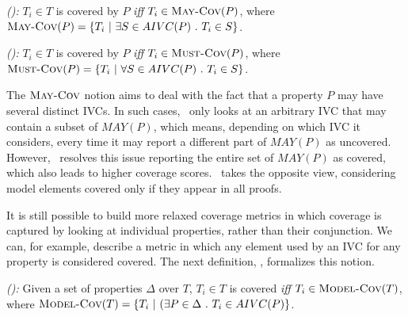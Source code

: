 \begin{definition} {\emph{(\maycov):}}
  \label{def:comp-1}
 $T_i \in T$ is covered by $P$ \emph{iff} $T_i \in \text{\sc May-Cov} (P)$, where
   $\text{\sc May-Cov} (P) = \{T_i ~|~ \exists S \in AIVC(P)~.~T_i \in S \}$.
\end{definition}

\begin{definition} {\emph{(\mustcov):}}
  \label{def:mustcov}
 $T_i \in T$ is covered by $P$ \emph{iff} $T_i \in \text{\sc Must-Cov} (P)$, where
   $\text{\sc Must-Cov} (P) = \{T_i ~|~ \forall S \in AIVC(P)~.~T_i \in S \}$.
\end{definition}

The $\text{\sc May-Cov}$ notion aims to deal with the fact that a property $P$ may have
several distinct IVCs. In such cases, \ivccov\ only looks at an arbitrary IVC
that may contain a subset of $MAY(P)$, which means, depending on
which IVC it considers, every time it may report a different part of $MAY(P)$
as uncovered. However, \maycov\ resolves this issue reporting the entire set of $MAY(P)$ as covered, which also leads to higher coverage scores.  \mustcov\ takes the opposite view, considering model elements covered only if they appear in all proofs.


It is still possible to build more relaxed coverage metrics in which coverage
is captured by looking at individual properties, rather than their conjunction.
We can, for example, describe a metric in which any element used by an IVC for any property is considered covered.
%
The next definition, \allcov, formalizes this notion.

\begin{definition} {\emph{(\allcov):}}
  \label{def:comp-2}
     Given a set of properties $\Delta$ over $T$, $T_i \in T$ is covered
   \emph{iff} $T_i \in \text{\sc Model-Cov} (T)$, where
   $\text{\sc Model-Cov} (T) = \{T_i ~|~ (\exists P \in \Delta~.~T_i \in AIVC(P) \}$.
\end{definition}


